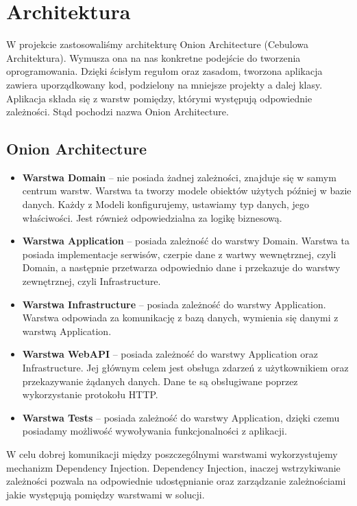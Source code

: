 \documentclass[a4paper,twoside,12pt]{book}
\begin{document}
\section{Architektura}
W projekcie zastosowaliśmy architekturę Onion Architecture (Cebulowa Architektura). Wymusza ona na nas konkretne podejście do tworzenia oprogramowania. Dzięki ścisłym regułom oraz zasadom, tworzona aplikacja zawiera uporządkowany kod, podzielony na mniejsze projekty a dalej klasy. Aplikacja składa się z warstw pomiędzy, którymi występują odpowiednie zależności. Stąd pochodzi nazwa Onion Architecture.

\subsection{Onion Architecture}
\begin{itemize}
    \item \textbf{Warstwa Domain} -- nie posiada żadnej zależności, znajduje się w samym centrum warstw. Warstwa ta tworzy modele obiektów użytych później w bazie danych. Każdy z Modeli konfigurujemy, ustawiamy typ danych, jego właściwości. Jest również odpowiedzialna za logikę biznesową. 
    \item \textbf{Warstwa Application} -- posiada zależność do warstwy Domain. Warstwa ta posiada implementacje serwisów, czerpie dane z wartwy wewnętrznej, czyli Domain, a następnie przetwarza odpowiednio dane i przekazuje do warstwy zewnętrznej, czyli Infrastructure. 
    \item \textbf{Warstwa Infrastructure} -- posiada zależność do warstwy Application. Warstwa odpowiada za komunikację z bazą danych, wymienia się danymi z warstwą Application. 
    \item \textbf{Warstwa WebAPI} -- posiada zależność do warstwy Application oraz Infrastructure. Jej głównym celem jest obsługa zdarzeń z użytkownikiem oraz przekazywanie żądanych danych. Dane te są obsługiwane poprzez wykorzystanie protokołu HTTP. 
    \item \textbf{Warstwa Tests} -- posiada zależność do warstwy Application, dzięki czemu posiadamy możliwość wywoływania funkcjonalności z aplikacji. 
\end{itemize}

W celu dobrej komunikacji między poszczególnymi warstwami wykorzystujemy mechanizm Dependency Injection. Dependency Injection, inaczej wstrzykiwanie zależności pozwala na odpowiednie udostępnianie oraz zarządzanie zależnościami jakie występują pomiędzy warstwami w solucji. 
\end{document}
